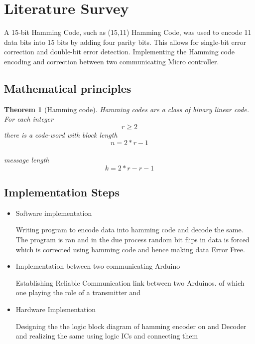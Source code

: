\documentclass{article}
\newtheorem{theorem}{Theorem}
\begin{document}
\section{Literature Survey}
A 15-bit Hamming Code, such as (15,11) Hamming Code, was used to encode 11 data bits into 15 bits by adding four parity bits. This allows for single-bit error correction and double-bit error detection. Implementing the Hamming code encoding and correction between two communicating Micro controller.\cite{10.11648/j.pamj.20160506.17}




\subsection {Mathematical principles}
\begin{theorem}[Hamming code]
\label{hamming code}
Hamming codes are a class of binary linear code. For each integer \[r \geq 2 \] there is a code-word with block length
\[n=2*r - 1\]\\
message length 
\[k=2*r-r-1\]
\end{theorem}




\subsection{Implementation Steps}
\begin{itemize}

\item {Software implementation}

Writing program to encode data into hamming code and decode the same. The program is ran and in the due process random bit flips in data is forced which is corrected using hamming code and hence making data Error Free.

\item {Implementation between two communicating Arduino}

Establishing Reliable Communication link between two Arduinos. of which one playing the role of a transmitter and 

\item {Hardware Implementation}

Designing the the logic block diagram of hamming encoder on and Decoder and realizing the same using logic ICs and connecting them 
\end{itemize}
\end{document}
